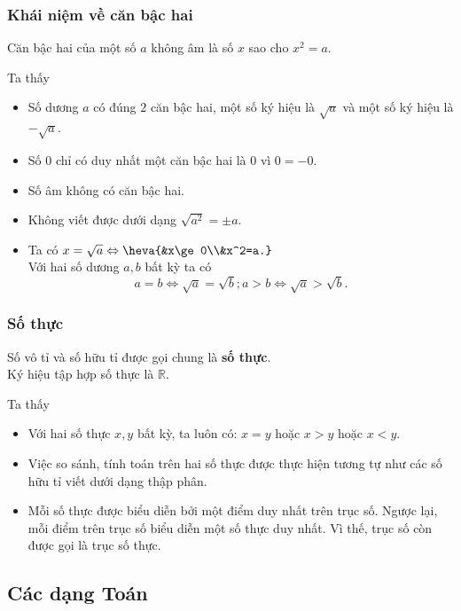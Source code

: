 \subsubsection{Khái niệm về căn bậc hai}
\begin{dn}
Căn bậc hai của một số $ a $ không âm là số $ x $ sao cho $ x^2=a $.
\end{dn}
\begin{nx}
Ta thấy
\begin{itemize}
	\item Số dương $ a $ có đúng $ 2 $ căn bậc hai, một số ký hiệu là $ \sqrt{a} $ và một số ký hiệu là $ -\sqrt{a} $.
	\item Số $ 0 $ chỉ có duy nhất một căn bậc hai là $ 0 $ vì $ 0=-0 $.
	\item Số âm không có căn bậc hai.
	\item Không viết được dưới dạng $ \sqrt{a^2}=\pm a $.
	\item Ta có $ x=\sqrt{a} \Leftrightarrow \heva{&x\ge0\\&x^2=a.} $\\
	Với hai số dương $ a,b $ bất kỳ ta có
	$$ a=b\Leftrightarrow \sqrt{a}=\sqrt{b};a>b\Leftrightarrow\sqrt{a}>\sqrt{b}. $$
\end{itemize}
\end{nx}
\subsubsection{Số thực}
\begin{dn}
Số vô tỉ và số hữu tỉ được gọi chung là \textbf{số thực}.\\
Ký hiệu tập hợp số thực là $ \mathbb{R} $.
\end{dn}
\begin{nx}
Ta thấy
\begin{itemize}
	\item Với hai số thực $ x,y $ bất kỳ, ta luôn có: $ x=y $ hoặc $ x>y $ hoặc $ x<y $.
	\item Việc so sánh, tính toán trên hai số thực được thực hiện tương tự như các số hữu tỉ viết dưới dạng thập phân.
	\item Mỗi số thực được biểu diễn bởi một điểm duy nhất trên trục số. Ngược lại, mỗi điểm trên trục số biểu diễn một số thực duy nhất. Vì thế, trục số còn được gọi là trục số thực.
\end{itemize}
\end{nx}
\subsection{Các dạng Toán}

